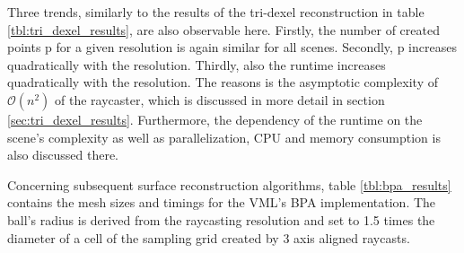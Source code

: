 %
Three trends, similarly to the results of the tri-dexel reconstruction in table \ref{tbl:tri_dexel_results}, are also observable here.
Firstly, the number of created points p for a given resolution is again similar for all scenes.
Secondly, p increases quadratically with the resolution.
Thirdly, also the runtime increases quadratically with the resolution.
The reasons is the asymptotic complexity of $\mathcal{O}(n^2)$ of the raycaster, which is discussed in more detail in section \ref{sec:tri_dexel_results}.
Furthermore, the dependency of the runtime on the scene's complexity as well as parallelization, CPU and memory consumption is also discussed there.

Concerning subsequent surface reconstruction algorithms, table \ref{tbl:bpa_results} contains the mesh sizes and timings for the VML's BPA implementation.
The ball's radius is derived from the raycasting resolution and set to 1.5 times the diameter of a cell of the sampling grid created by 3 axis aligned raycasts.
%
